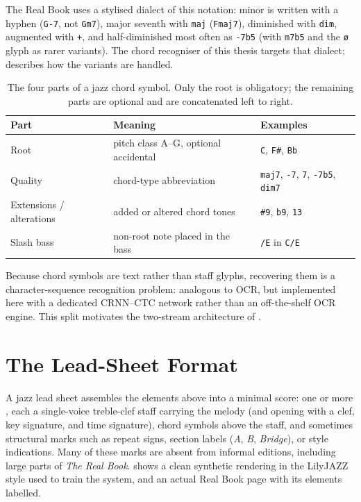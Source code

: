 The Real Book uses a stylised dialect of this notation: minor is written with
a hyphen (\texttt{G-7}, not \texttt{Gm7}), major seventh with \texttt{maj}
(\texttt{Fmaj7}), diminished with \texttt{dim}, augmented with \texttt{+}, and
half-diminished most often as \texttt{-7b5} (with \texttt{m7b5} and the
\texttt{ø} glyph as rarer variants).  The chord recogniser of this thesis
targets that dialect;  describes how the variants
are handled.

\begin{table}[htbp]
    \centering
    \caption{The four parts of a jazz chord symbol.
    Only the root is obligatory; the remaining parts are optional and are concatenated left
    to right.}
    \label{tab:chord-anatomy}
    \small
    \setlength{\tabcolsep}{8pt}
    \renewcommand{\arraystretch}{1.2}
    \begin{tabular}{@{} l l l @{}}
        \toprule
        \textbf{Part} & \textbf{Meaning} & \textbf{Examples} \\
        \midrule
        Root                     & pitch class A--G, optional accidental & \texttt{C}, \texttt{F\#}, \texttt{Bb} \\
        Quality                  & chord-type abbreviation               & \texttt{maj7}, \texttt{-7}, \texttt{7}, \texttt{-7b5}, \texttt{dim7} \\
        Extensions / alterations & added or altered chord tones          & \texttt{\#9}, \texttt{b9}, \texttt{13} \\
        Slash bass               & non-root note placed in the bass      & \texttt{/E} in \texttt{C/E} \\
        \bottomrule
    \end{tabular}
\end{table}

Because chord symbols are text rather than staff glyphs, recovering them is a
character-sequence recognition problem: analogous to OCR, but implemented here
with a dedicated CRNN--CTC network rather than an off-the-shelf OCR engine.
This split motivates the two-stream architecture of .

\section{The Lead-Sheet Format}

A jazz lead sheet assembles the elements above into a minimal score: one or more
, each a single-voice treble-clef staff carrying the melody (and opening
with a clef, key signature, and time signature), chord symbols above the staff, and
sometimes structural marks such as repeat signs, section labels (\textit{A},
\textit{B}, \textit{Bridge}), or style indications.
Many of these marks are absent from informal editions, including large parts of
\textit{The Real Book}.
 shows a clean synthetic rendering in the LilyJAZZ style used
to train the system, and  an actual Real Book page with its
elements labelled.

